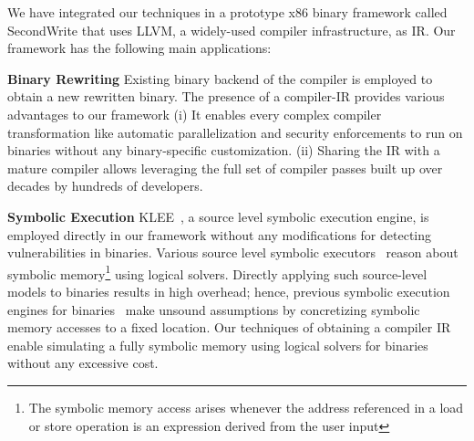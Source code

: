 We have integrated our techniques in a prototype x86 binary framework called SecondWrite that uses LLVM, a widely-used compiler infrastructure, as IR. Our framework has the following main applications:


\squishlist

\item \textbf{Binary Rewriting}
Existing binary backend of the compiler is employed to obtain a new rewritten binary. The presence of a compiler-IR provides various advantages to our framework (i) It enables every complex compiler transformation like automatic parallelization and security enforcements to run on binaries without any binary-specific customization. (ii) Sharing the IR with a mature compiler allows leveraging the full set of compiler passes built up over decades by hundreds of developers. 


\item \textbf{Symbolic Execution} KLEE~\cite{Cadar-KLEE}, a source level symbolic execution engine, is employed directly in our framework without any modifications for detecting vulnerabilities in binaries. Various source level symbolic executors~\cite{Cadar-EXE, Cadar-KLEE} reason about symbolic memory\footnote{The symbolic memory access arises whenever the address referenced in a load or store operation is an expression derived from the user input} using logical solvers. Directly applying such source-level models to binaries results in high overhead; hence, previous symbolic execution engines for binaries~\cite{Song-Bitblaze,Chipounov-S2E} make unsound assumptions by concretizing symbolic memory accesses to a fixed location. Our techniques of obtaining a compiler IR enable simulating a fully symbolic memory using logical solvers for binaries without any excessive cost. 

